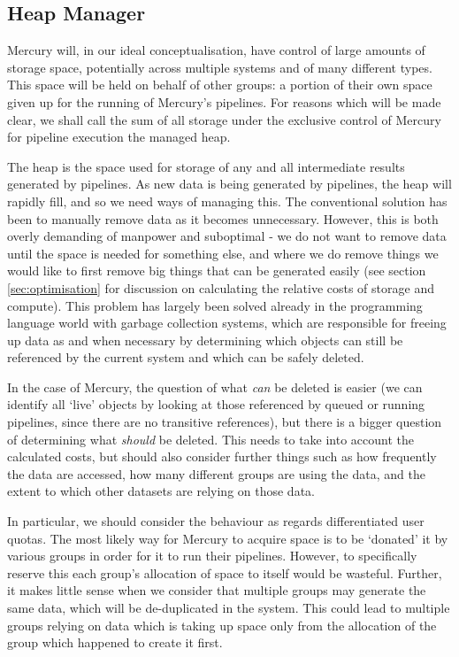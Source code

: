 \documentclass[10pt,a4paper]{article}
\newcommand{\npar}{\par\noindent\space}
\begin{document}
\subsection{Heap Manager}
\npar Mercury will, in our ideal conceptualisation, have control of large amounts of storage space, potentially across multiple systems and of many different types. This space will be held on behalf of other groups: a portion of their own space given up for the running of Mercury's pipelines. For reasons which will be made clear, we shall call the sum of all storage under the exclusive control of Mercury for pipeline execution the managed heap.
\npar The heap is the space used for storage of any and all intermediate results generated by pipelines. As new data is being generated by pipelines, the heap will rapidly fill, and so we need ways of managing this. The conventional solution has been to manually remove data as it becomes unnecessary. However, this is both overly demanding of manpower and suboptimal - we do not want to remove data until the space is needed for something else, and where we do remove things we would like to first remove big things that can be generated easily (see section \ref{sec:optimisation} for discussion on calculating the relative costs of storage and compute). This problem has largely been solved already in the programming language world with garbage collection systems, which are responsible for freeing up data as and when necessary by determining which objects can still be referenced by the current system and which can be safely deleted.
\npar In the case of Mercury, the question of what \textit{can} be deleted is easier (we can identify all `live' objects by looking at those referenced by queued or running pipelines, since there are no transitive references), but there is a bigger question of determining what \textit{should} be deleted. This needs to take into account the calculated costs, but should also consider further things such as how frequently the data are accessed, how many different groups are using the data, and the extent to which other datasets are relying on those data.
\npar In particular, we should consider the behaviour as regards differentiated user quotas. The most likely way for Mercury to acquire space is to be `donated' it by various groups in order for it to run their pipelines. However, to specifically reserve this each group's allocation of space to itself would be wasteful. Further, it makes little sense when we consider that multiple groups may generate the same data, which will be de-duplicated in the system. This could lead to multiple groups relying on data which is taking up space only from the allocation of the group which happened to create it first.
\end{document}
